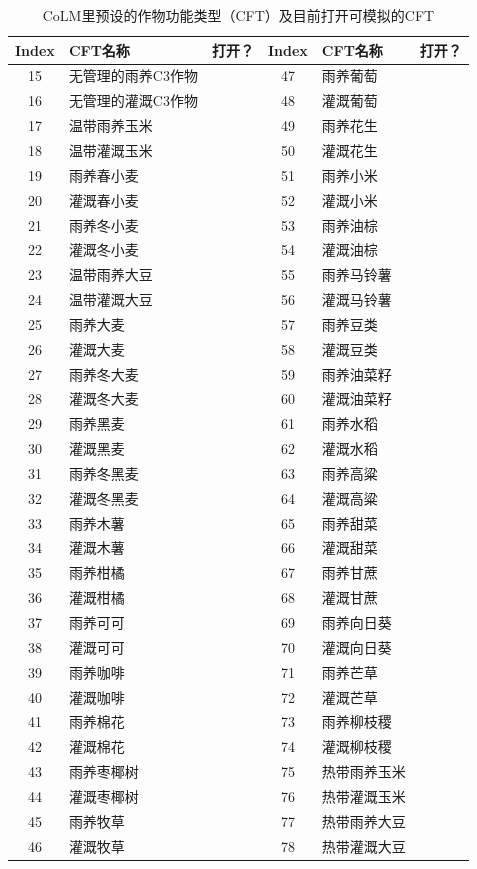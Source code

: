{
\begin{table}[htbp]
\centering
  \caption{CoLM里预设的作物功能类型（CFT）及目前打开可模拟的CFT}
  \label{tab:CoLM预设作物功能类型}
  \begin{tabular}{@{}clc|clc@{}}
  \toprule
  Index	& CFT名称	& 打开？&	Index	& CFT名称	& 打开？\\
  \midrule
  15 &	无管理的雨养C3作物	 &   &	47	& 雨养葡萄	&  \\
  16 &	无管理的灌溉C3作物	 &  &	48 &	灌溉葡萄	&  \\
  17 &	温带雨养玉米	& \checkmark &	49	& 雨养花生 & \\
  18 &  温带灌溉玉米	& \checkmark &	50	& 灌溉花生 & \\
  19 &  雨养春小麦	& \checkmark & 51	& 雨养小米  & \\
  20 &  灌溉春小麦	& \checkmark & 52	& 灌溉小米  & \\
  21 & 雨养冬小麦	& \checkmark & 53	& 雨养油棕  & \\
  22 & 灌溉冬小麦	& \checkmark & 54	& 灌溉油棕  & \\
  23 & 温带雨养大豆	& \checkmark & 55	& 雨养马铃薯	& \\
  24 & 温带灌溉大豆	& \checkmark & 56	& 灌溉马铃薯	& \\
  25 & 雨养大麦 & 	& 57 &	雨养豆类	& \\
  26 & 灌溉大麦 &  & 58 &	灌溉豆类	& \\
  27 & 雨养冬大麦 &	 & 59 & 雨养油菜籽 & \\
  28 & 灌溉冬大麦 &	 & 60 & 灌溉油菜籽 & \\
  29 & 雨养黑麦 & 	& 61 &	雨养水稻	& \checkmark \\
  30 & 灌溉黑麦 & 	& 62 &	灌溉水稻	& \checkmark \\
  31 & 雨养冬黑麦 &	 &	63 & 雨养高粱 & \\
  32 & 灌溉冬黑麦 &	 &	64 & 灌溉高粱 & \\
  33 & 雨养木薯 &	 &	65 & 雨养甜菜 & \\
  34 & 灌溉木薯 &	 &	66 & 灌溉甜菜 & \\
  35 & 雨养柑橘 &	 &  67 & 雨养甘蔗 & \\
  36 & 灌溉柑橘 &   &	68 & 灌溉甘蔗 & \\
  37 & 雨养可可 &	 &	69 & 雨养向日葵 &	\\
  38 & 灌溉可可 &   &	70 & 灌溉向日葵 & \\
  39 & 雨养咖啡 &   &	71 & 雨养芒草 & \\
  40 & 灌溉咖啡 &   &	72 & 灌溉芒草 & \\
  41 & 雨养棉花 &	 &  73 & 雨养柳枝稷 & \\
  42 & 灌溉棉花 &	 &  74 & 灌溉柳枝稷 & \\
  43 & 雨养枣椰树 &  &	75 & 热带雨养玉米	& \checkmark \\
  44 & 灌溉枣椰树 &  &	76 & 热带灌溉玉米	& \checkmark \\
  45 & 雨养牧草 &   &	77 & 热带雨养大豆	& \checkmark \\
  46 & 灌溉牧草 &   &	78 & 热带灌溉大豆	& \checkmark \\
  \bottomrule
  \end{tabular}
\end{table}
}

